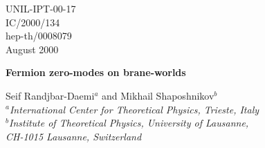 \documentclass[a4paper,12pt]{article}
\begin{document}
\topmargin -1.0cm
\oddsidemargin -0.8cm
\evensidemargin -0.8cm
\pagestyle{empty}
\begin{flushright}
UNIL-IPT-00-17\\
IC/2000/134\\
hep-th/0008079\\
August 2000
\end{flushright}
\vspace*{5mm}

\begin{center}

{\Large\bf Fermion zero-modes on brane-worlds \\}
\vspace{1.0cm}

{\large Seif Randjbar-Daemi$^a$  and 
Mikhail Shaposhnikov$^b$}\\
\vspace{.6cm}
{\it {$^{a}$International Center for Theoretical Physics, Trieste,
Italy}}\\
{\it {$^{b}$Institute of Theoretical Physics, University of Lausanne,
\\
CH-1015 Lausanne, Switzerland}}\\

\vspace{.4cm}
\end{center}

\vspace{1cm}
\begin{abstract}

We study localization of bulk fermions on a brane with inclusion of
Yang-Mills and scalar backgrounds in higher dimensions and give the
conditions under which localized chiral fermions can be obtained. 

\end{abstract}

\vfill


\eject
\pagestyle{empty}
\setcounter{page}{1}
\setcounter{footnote}{0}
\pagestyle{plain}

\end{document}
